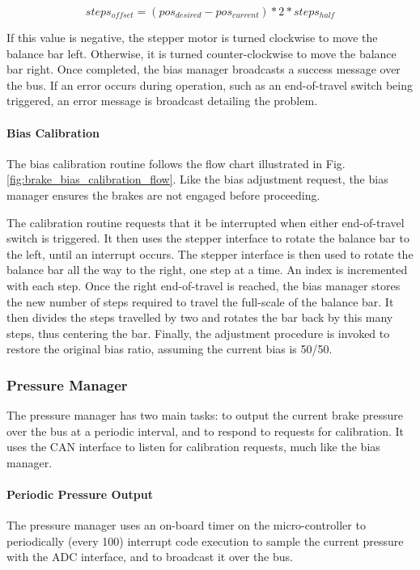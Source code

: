 \[
steps_{offset} = (pos_{desired} - pos_{current}) * 2 * steps_{half}
\]

If this value is negative, the stepper motor is turned clockwise to move the balance bar left. Otherwise, it is turned counter-clockwise to move the balance bar right. Once completed, the bias manager broadcasts a success message over the bus. If an error occurs during operation, such as an end-of-travel switch being triggered, an error message is broadcast detailing the problem. 

\paragraph{Bias Calibration}

The bias calibration routine follows the flow chart illustrated in Fig. \ref{fig:brake_bias_calibration_flow}. Like the bias adjustment request, the bias manager ensures the brakes are not engaged before proceeding.

The calibration routine requests that it be interrupted when either end-of-travel switch is triggered. It then uses the stepper interface to rotate the balance bar to the left, until an interrupt occurs. The stepper interface is then used to rotate the balance bar all the way to the right, one step at a time. An index is incremented with each step. Once the right end-of-travel is reached, the bias manager stores the new number of steps required to travel the full-scale of the balance bar. It then divides the steps travelled by two and rotates the bar back by this many steps, thus centering the bar. Finally, the adjustment procedure is invoked to restore the original bias ratio, assuming the current bias is 50/50.

\subsubsection{Pressure Manager}

The pressure manager has two main tasks: to output the current brake pressure over the bus at a periodic interval, and to respond to requests for calibration. It uses the CAN interface to listen for calibration requests, much like the bias manager. 

\paragraph{Periodic Pressure Output}

The pressure manager uses an on-board timer on the micro-controller to periodically (every \unit{100}{\milli\second}) interrupt code execution to sample the current pressure with the ADC interface, and to broadcast it over the bus. 

